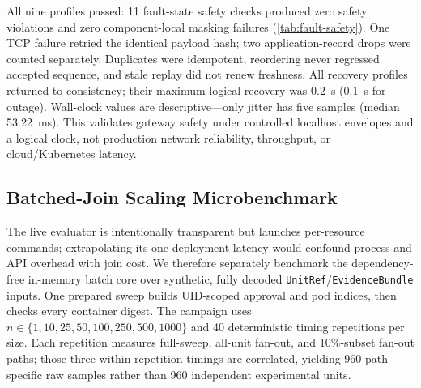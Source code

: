 \begin{table}[t]
\centering
\caption{Controlled Localhost Evidence-Transport Fault Campaign. Safety Means
No Component Is Reported Consistent from Invalid/Unavailable Required
Evidence; Masking Requires Unrelated Components to Remain Decidable.}
\label{tab:fault-safety}
\scriptsize
\resizebox{0.9\textwidth}{!}{}
\end{table}

All nine profiles passed: 11 fault-state safety checks produced zero safety
violations and zero component-local masking failures
(\cref{tab:fault-safety}). One TCP failure retried the identical payload hash;
two application-record drops were counted separately. Duplicates were
idempotent, reordering never regressed accepted sequence, and stale replay did
not renew freshness. All recovery profiles returned to consistency; their
maximum logical recovery was 0.2~s (0.1~s for outage). Wall-clock values are
descriptive---only jitter has five samples (median 53.22~ms). This validates
gateway safety under controlled localhost envelopes and a logical clock, not
production network reliability, throughput, or cloud/Kubernetes latency.

\subsection{Batched-Join Scaling Microbenchmark}
The live evaluator is intentionally transparent but launches per-resource
commands; extrapolating its one-deployment latency would confound process and
API overhead with join cost. We therefore separately benchmark the
dependency-free in-memory batch core over synthetic, fully decoded
\texttt{UnitRef}/\texttt{EvidenceBundle} inputs. One prepared sweep builds
UID-scoped approval and pod indices, then checks every container digest. The
campaign uses $n\in\{1,10,25,50,100,250,500,1000\}$ and 40 deterministic
timing repetitions per size. Each repetition measures full-sweep, all-unit
fan-out, and 10\%-subset fan-out paths; those three within-repetition timings
are correlated, yielding 960 path-specific raw samples rather than 960
independent experimental units.

\begin{table}[t]
\centering
\caption{In-Memory Batched-Join Microbenchmark. Calls Are Architectural
Counts, Not Observed API Requests; Kubernetes, Network, Parsing, Controllers,
and Persistence Are Excluded.}
\label{tab:scaling}
\scriptsize
\resizebox{0.92\textwidth}{!}{}
\end{table}

